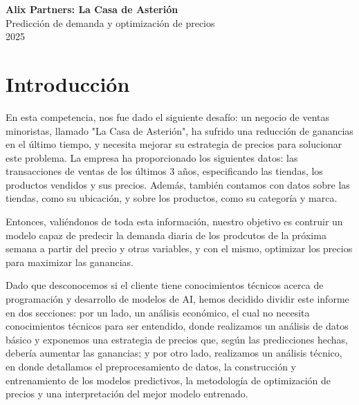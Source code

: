 \documentclass[12pt,a4paper]{article}
\begin{document}
\begin{titlepage}
    \centering
    \vspace*{2cm}
    
    {\Huge \textbf{Alix Partners: La Casa de Asterión}}\\[0.5cm]
    {\Large Predicción de demanda y optimización de precios}\\[1.5cm]
    
    {\Large 2025}\\[2cm]

\end{titlepage}

\tableofcontents
\newpage

\section{Introducción}

En esta competencia, nos fue dado el siguiente desafío: un negocio de ventas minoristas, llamado "La Casa de Asterión", ha sufrido una reducción de ganancias 
en el último tiempo, y necesita mejorar su estrategia de precios para solucionar este problema. La empresa ha proporcionado los siguientes datos: las transacciones 
de ventas de los últimos 3 años, especificando las tiendas, los productos vendidos y sus precios. Además, también contamos con datos sobre las tiendas, como su ubicación, 
y sobre los productos, como su categoría y marca. 

\vspace{0.2cm}

Entonces, valiéndonos de toda esta información, nuestro objetivo es contruir un modelo capaz de predecir la demanda diaria de los prodcutos de la próxima semana a 
partir del precio y otras variables, y con el mismo, optimizar los precios para maximizar las ganancias.

\vspace{0.2cm}

Dado que desconocemos si el cliente tiene conocimientos técnicos acerca de programación y desarrollo de modelos de AI, 
hemos decidido dividir este informe en dos secciones: por un lado, un análisis económico, el cual no necesita conocimientos técnicos para ser entendido, 
donde realizamos un análisis de datos básico y exponemos una estrategia de precios que, según las predicciones hechas, debería aumentar las ganancias; 
y por otro lado, realizamos un análisis técnico, en donde detallamos el preprocesamiento de datos, la construcción y entrenamiento de los modelos predictivos, 
la metodología de optimización de precios y una interpretación del mejor modelo entrenado.
\end{document}
